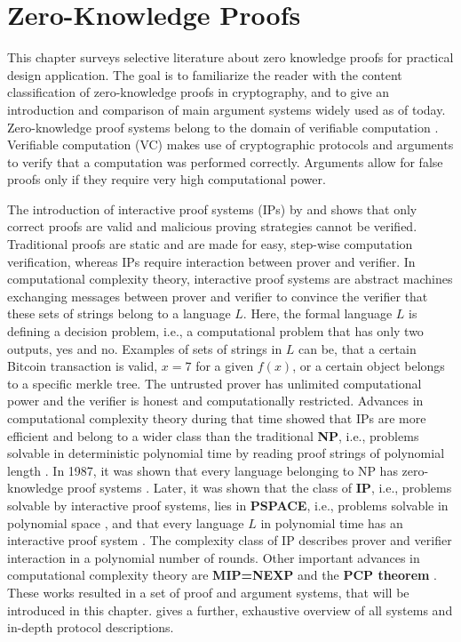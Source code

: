 \chapter{Zero-Knowledge Proofs}
This chapter surveys selective literature about zero knowledge proofs for practical design application. The goal is to familiarize the reader with the content classification of zero-knowledge proofs in cryptography, and to give an introduction and comparison of main argument systems widely used as of today. Zero-knowledge proof systems belong to the domain of verifiable computation \citep{Simunic, Ahmad}. Verifiable computation (VC) makes use of cryptographic protocols and arguments to verify that a computation was performed correctly. Arguments allow for false proofs only if they require very high computational power. 

The introduction of interactive proof systems (IPs) by \citet{GoldwasserIPs} and \citet{BabaiIPs} shows that only correct proofs are valid and malicious proving strategies cannot be verified. Traditional proofs are static and are made for easy, step-wise computation verification, whereas IPs require interaction between prover and verifier. In computational complexity theory, interactive proof systems are abstract machines exchanging messages between prover and verifier to convince the verifier that these sets of strings belong to a language \(L\). Here, the formal language \(L\) is defining a decision problem, i.e., a computational problem that has only two outputs, yes and no. Examples of sets of strings in \(L\) can be, that a certain Bitcoin transaction is valid, \(x = 7\) for a given \(f(x)\), or a certain object belongs to a specific merkle tree. The untrusted prover has unlimited computational power and the verifier is honest and computationally restricted. Advances in computational complexity theory during that time showed that IPs are more efficient and belong to a wider class than the traditional \textbf{NP}, i.e., problems solvable in deterministic polynomial time by reading proof strings of polynomial length \citep{SassonIOPsinproceedings}. In 1987, it was shown that every language belonging to NP has zero-knowledge proof systems \citep{anymental10.1145/28395.28420}. Later, it was shown that the class of \textbf{IP}, i.e., problems solvable by interactive proof systems, lies in \textbf{PSPACE}, i.e., problems solvable in polynomial space \citep{Shamir10.1145/146585.146609}, and that every language \(L\) in polynomial time has an interactive proof system \citep{Lund10.1145/146585.146605}. The complexity class of IP describes prover and verifier interaction in a polynomial number of rounds. Other important advances in computational complexity theory are \textbf{MIP=NEXP} \citep{Laszlo} and the \textbf{PCP theorem} \citep{PCPTheorem}. These works resulted in a set of proof and argument systems, that will be introduced in this chapter. \citet{Thaler} gives a further, exhaustive overview of all systems and in-depth protocol descriptions. 

